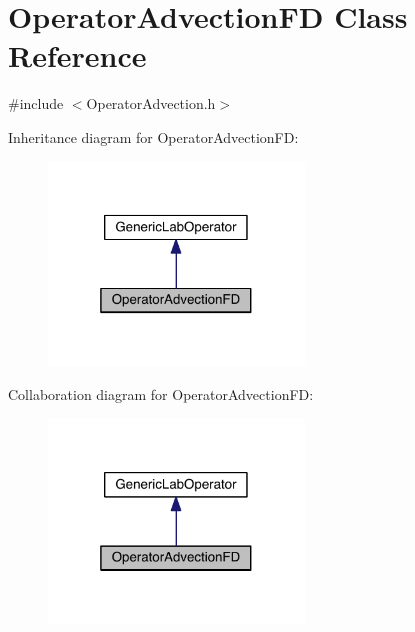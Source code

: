 \hypertarget{class_operator_advection_f_d}{}\section{Operator\+Advection\+F\+D Class Reference}
\label{class_operator_advection_f_d}


{\ttfamily \#include $<$Operator\+Advection.\+h$>$}



Inheritance diagram for Operator\+Advection\+F\+D\+:\nopagebreak
\begin{figure}[H]
\begin{center}
\leavevmode
\includegraphics[width=193pt]{d1/da5/class_operator_advection_f_d__inherit__graph}
\end{center}
\end{figure}


Collaboration diagram for Operator\+Advection\+F\+D\+:\nopagebreak
\begin{figure}[H]
\begin{center}
\leavevmode
\includegraphics[width=193pt]{d0/d6b/class_operator_advection_f_d__coll__graph}
\end{center}
\end{figure}

